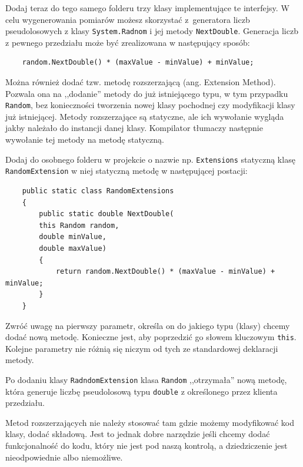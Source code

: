 Dodaj teraz do tego samego folderu trzy klasy implementujące te interfejsy. W celu wygenerowania pomiarów możesz skorzystać z~generatora liczb pseudolosowych z klasy \texttt{System.Radnom} i jej metody \texttt{NextDouble}. Generacja liczb z pewnego przedziału może być zrealizowana w następujący sposób:
\begin{lstlisting}	
	random.NextDouble() * (maxValue - minValue) + minValue;
\end{lstlisting}
Można również dodać tzw. metodę rozszerzającą (ang. Extension Method). Pozwala ona na ,,dodanie'' metody do już istniejącego typu, w tym przypadku \texttt{Random}, bez konieczności tworzenia nowej klasy pochodnej czy modyfikacji klasy już istniejącej. Metody rozszerzające są statyczne, ale ich wywołanie wygląda jakby należało do instancji danej klasy. Kompilator tłumaczy następnie wywołanie tej metody na metodę statyczną. 

Dodaj do osobnego folderu w projekcie o nazwie np. \texttt{Extensions} statyczną klasę \texttt{RandomExtension} w niej statyczną metodę w następującej postacji:
\begin{lstlisting}	
	public static class RandomExtensions
	{
		public static double NextDouble(
		this Random random,
		double minValue,
		double maxValue)
		{
			return random.NextDouble() * (maxValue - minValue) + minValue;
		}
	}
\end{lstlisting}
Zwróć uwagę na pierwszy parametr, określa on do jakiego typu (klasy) chcemy dodać nową metodę. Konieczne jest, aby poprzedzić go słowem kluczowym \texttt{this}. Kolejne parametry nie różnią się niczym od tych ze standardowej deklaracji metody.

Po dodaniu klasy \texttt{RadndomExtension} klasa \texttt{Random} ,,otrzymała'' nową metodę, która generuje liczbę pseudolosową typu \texttt{double} z określonego przez klienta przedziału. 

Metod rozszerzających nie należy stosować tam gdzie możemy modyfikować kod klasy, dodać składową. Jest to jednak dobre narzędzie jeśli chcemy dodać funkcjonalność do kodu, który nie jest pod naszą kontrolą, a dziedziczenie jest nieodpowiednie albo niemożliwe. 



